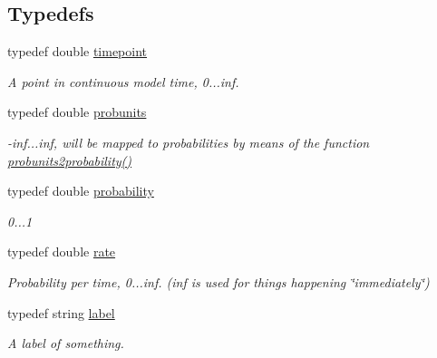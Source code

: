 \subsection*{Typedefs}
\begin{DoxyCompactItemize}
\item 
\mbox{\label{namespacetricl_a720ff6a29f998e11e1d3622fc8df64b1}} 
typedef double \hyperlink{namespacetricl_a720ff6a29f998e11e1d3622fc8df64b1}{timepoint}
\begin{DoxyCompactList}\small\item\em A point in continuous model time, 0...inf. \end{DoxyCompactList}\item 
\mbox{\label{namespacetricl_af8f8f9076e92e1c664ffa96f18d038a5}} 
typedef double \hyperlink{namespacetricl_af8f8f9076e92e1c664ffa96f18d038a5}{probunits}
\begin{DoxyCompactList}\small\item\em -\/inf...inf, will be mapped to probabilities by means of the function \hyperlink{probability_8h_a278b4df0353e94d6cf8cfb59a0d8058a}{probunits2probability()} \end{DoxyCompactList}\item 
\mbox{\label{namespacetricl_af2e8973ba58a3dad9061296d8bee16a2}} 
typedef double \hyperlink{namespacetricl_af2e8973ba58a3dad9061296d8bee16a2}{probability}
\begin{DoxyCompactList}\small\item\em 0...1 \end{DoxyCompactList}\item 
\mbox{\label{namespacetricl_ae42d2696f294300a43e0f5edf4875479}} 
typedef double \hyperlink{namespacetricl_ae42d2696f294300a43e0f5edf4875479}{rate}
\begin{DoxyCompactList}\small\item\em Probability per time, 0...inf. (inf is used for things happening \char`\"{}immediately\char`\"{}) \end{DoxyCompactList}\item 
\mbox{\label{namespacetricl_a77e7daffafa870e5786b344119da9b15}} 
typedef string \hyperlink{namespacetricl_a77e7daffafa870e5786b344119da9b15}{label}
\begin{DoxyCompactList}\small\item\em A label of something. \end{DoxyCompactList}\item 

\end{DoxyCompactItemize}

